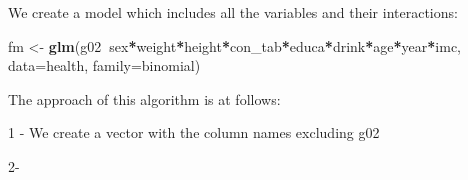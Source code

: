 \documentclass[]{article}
\newenvironment{Shaded}{\begin{snugshade}}{\end{snugshade}}
\newcommand{\DataTypeTok}[1]{\textcolor[rgb]{0.13,0.29,0.53}{#1}}
\newcommand{\KeywordTok}[1]{\textcolor[rgb]{0.13,0.29,0.53}{\textbf{#1}}}
\newcommand{\NormalTok}[1]{#1}
\newcommand{\OperatorTok}[1]{\textcolor[rgb]{0.81,0.36,0.00}{\textbf{#1}}}
\newcommand{\StringTok}[1]{\textcolor[rgb]{0.31,0.60,0.02}{#1}}
\begin{document}
We create a model which includes all the variables and their
interactions:

\begin{Shaded}
\begin{Highlighting}[]
\NormalTok{fm <-}\StringTok{ }\KeywordTok{glm}\NormalTok{(g02}\OperatorTok{~}\NormalTok{sex}\OperatorTok{*}\NormalTok{weight}\OperatorTok{*}\NormalTok{height}\OperatorTok{*}\NormalTok{con_tab}\OperatorTok{*}\NormalTok{educa}\OperatorTok{*}\NormalTok{drink}\OperatorTok{*}\NormalTok{age}\OperatorTok{*}\NormalTok{year}\OperatorTok{*}\NormalTok{imc, }\DataTypeTok{data=}\NormalTok{health, }\DataTypeTok{family=}\NormalTok{binomial)}
\end{Highlighting}
\end{Shaded}

The approach of this algorithm is at follows:

1 - We create a vector with the column names excluding g02

2-
\end{document}

